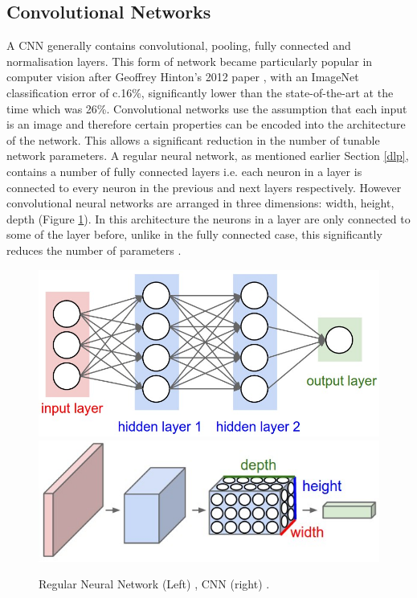\documentclass[a4paper,11pt,notitlepage]{article}
\begin{document}
\subsection{Convolutional Networks} \label{Cnn_section}
A CNN generally contains convolutional, pooling, fully connected and normalisation layers. This form of network became particularly popular in computer vision after Geoffrey Hinton's 2012 paper \cite{GH_CNN}, with an ImageNet classification error of c.16\%, significantly lower than the state-of-the-art at the time which was 26\%. Convolutional networks use the assumption that each input is an image and therefore certain properties can be encoded into the architecture of the network. This allows a significant reduction in the number of tunable network parameters.
\newline \newline
A regular neural network, as mentioned earlier Section \ref{dlp}, contains a number of fully connected layers i.e. each neuron in a layer is connected to every neuron in the previous and next layers respectively. However convolutional neural networks are arranged in three dimensions: width, height, depth (Figure \ref{CNNvsNN}). In this architecture the neurons in a layer are only connected to some of the layer before, unlike in the fully connected case, this significantly reduces the number of parameters \cite{StanfordCS231_1}.

\noindent \begin{figure}[h!]
\includegraphics[width = 0.5\hsize]{./figures/neural_net2.jpeg}
\includegraphics[width = 0.5\hsize]{./figures/cnn.jpeg}
\caption{Regular Neural Network (Left) \cite{StanfordCS231_1} , CNN (right) \cite{StanfordCS231_1}.}
\label{CNNvsNN}
\end{figure}
\end{document}
